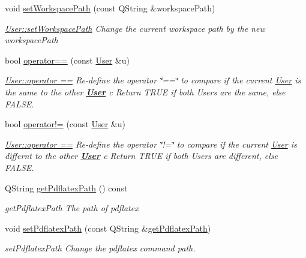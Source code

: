 \begin{DoxyCompactItemize}
void \hyperlink{classModels_1_1User_ae62b6cc7c6c5f5ab80b9f066b67afc95}{set\-Workspace\-Path} (const Q\-String \&workspace\-Path)
\begin{DoxyCompactList}\small\item\em \hyperlink{classModels_1_1User_ae62b6cc7c6c5f5ab80b9f066b67afc95}{User\-::set\-Workspace\-Path} Change the current workspace path by the new {\itshape workspace\-Path} \end{DoxyCompactList}\item 
bool \hyperlink{classModels_1_1User_a60d18c2d1df053f1abf1215414f0b4b6}{operator==} (const \hyperlink{classModels_1_1User}{User} \&u)
\begin{DoxyCompactList}\small\item\em \hyperlink{classModels_1_1User_a60d18c2d1df053f1abf1215414f0b4b6}{User\-::operator ==} Re-\/define the operator \char`\"{}==\char`\"{} to compare if the current \hyperlink{classModels_1_1User}{User} is the same to the other {\bfseries \hyperlink{classModels_1_1User}{User}} {\itshape c} Return T\-R\-U\-E if both Users are the same, else F\-A\-L\-S\-E. \end{DoxyCompactList}\item 
bool \hyperlink{classModels_1_1User_aa1cdb1f752173aedd5f0c43edcb0b10b}{operator!=} (const \hyperlink{classModels_1_1User}{User} \&u)
\begin{DoxyCompactList}\small\item\em \hyperlink{classModels_1_1User_a60d18c2d1df053f1abf1215414f0b4b6}{User\-::operator ==} Re-\/define the operator \char`\"{}!=\char`\"{} to compare if the current \hyperlink{classModels_1_1User}{User} is differnt to the other {\bfseries \hyperlink{classModels_1_1User}{User}} {\itshape c} Return T\-R\-U\-E if both Users are different, else F\-A\-L\-S\-E. \end{DoxyCompactList}\item 
Q\-String \hyperlink{classModels_1_1User_ae8a894050c3e9266518707f6e5cd1c2f}{get\-Pdflatex\-Path} () const 
\begin{DoxyCompactList}\small\item\em get\-Pdflatex\-Path The path of pdflatex \end{DoxyCompactList}\item 
void \hyperlink{classModels_1_1User_ac65a44513c34f7e67888062d8bee3e54}{set\-Pdflatex\-Path} (const Q\-String \&\hyperlink{classModels_1_1User_ae8a894050c3e9266518707f6e5cd1c2f}{get\-Pdflatex\-Path})
\begin{DoxyCompactList}\small\item\em set\-Pdflatex\-Path Change the pdflatex command path. \end{DoxyCompactList}\item 

\end{DoxyCompactItemize}
